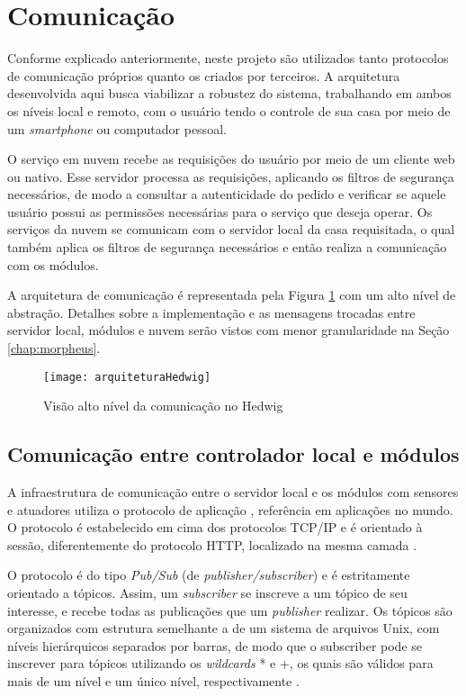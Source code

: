 \section{Comunicação}

Conforme explicado anteriormente, neste projeto são utilizados tanto protocolos de comunicação próprios quanto os criados por terceiros. A arquitetura desenvolvida aqui busca viabilizar a robustez do sistema, trabalhando em ambos os níveis local e remoto, com o usuário tendo o controle de sua casa por meio de um \textit{smartphone} ou computador pessoal.

O serviço em nuvem recebe as requisições do usuário por meio de um cliente web ou nativo. Esse servidor processa as requisições, aplicando os filtros de segurança necessários, de modo a consultar a autenticidade do pedido e verificar se aquele usuário possui as permissões necessárias para o serviço que deseja operar. Os serviços da nuvem se comunicam com o servidor local da casa requisitada, o qual também aplica os filtros de segurança necessários e então realiza a comunicação com os módulos.

A arquitetura de comunicação é representada pela Figura \ref{fig:diagramaComunicacao} com um alto nível de abstração. Detalhes sobre a implementação e as mensagens trocadas entre servidor local, módulos e nuvem serão vistos com menor granularidade na Seção \ref{chap:morpheus}.

\begin{figure}[H]
	\centering
	\caption{Visão alto nível da comunicação no Hedwig}
  \texttt{[image: arquiteturaHedwig]}
\label{fig:diagramaComunicacao}
\end{figure}

\subsection{Comunicação entre controlador local e módulos}

A infraestrutura de comunicação entre o servidor local e os módulos com sensores e atuadores utiliza o protocolo de aplicação \wmqtt{}, referência em aplicações \wiot{} no mundo. O protocolo \wmqtt{} é estabelecido em cima dos protocolos TCP/IP e é orientado à sessão, diferentemente do protocolo HTTP, localizado na mesma camada \cite{ibmMqtt}.

O protocolo \wmqtt{} é do tipo \emph{Pub/Sub} (de \textit{publisher/subscriber}) e é estritamente orientado a tópicos. Assim, um \textit{subscriber} se inscreve a um tópico de seu interesse, e recebe todas as publicações que um \textit{publisher} realizar. Os tópicos são organizados com estrutura semelhante a de um sistema de arquivos Unix, com níveis hierárquicos separados por barras, de modo que o subscriber pode se inscrever para tópicos utilizando os \textit{wildcards} * e +, os quais são válidos para mais de um nível e um único nível, respectivamente \cite{mqttDocumentation}.

